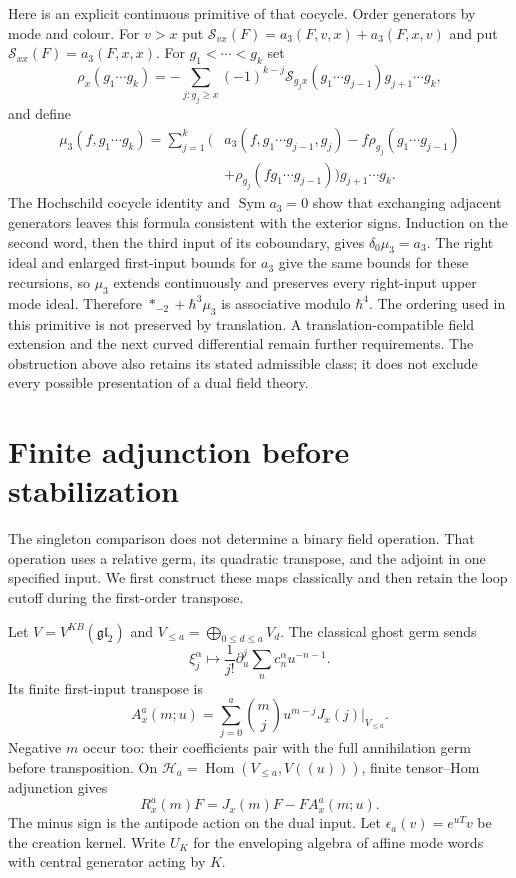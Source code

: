 Here is an explicit continuous primitive of that cocycle.  Order
generators by mode and colour.  For $v>x$ put
$\mathcal S_{vx}(F)=a_3(F,v,x)+a_3(F,x,v)$ and put
$\mathcal S_{xx}(F)=a_3(F,x,x)$.  For $g_1<\cdots<g_k$ set
\[
 \rho_x(g_1\cdots g_k)=
 -\sum_{j:g_j\geq x}(-1)^{k-j}
       \mathcal S_{g_jx}(g_1\cdots g_{j-1})g_{j+1}\cdots g_k,
\]
and define
\begin{equation}\label{cyquant:eq:cubic-primitive}
 \begin{aligned}
 \mu_3(f,g_1\cdots g_k)=\sum_{j=1}^k
 \bigl(&a_3(f,g_1\cdots g_{j-1},g_j)
       -f\rho_{g_j}(g_1\cdots g_{j-1})\\
       &+\rho_{g_j}(fg_1\cdots g_{j-1})\bigr)g_{j+1}\cdots g_k.
 \end{aligned}
\end{equation}
The Hochschild cocycle identity and $\operatorname{Sym}a_3=0$
show that exchanging adjacent generators leaves this formula
consistent with the exterior signs.  Induction on the second word,
then the third input of its coboundary, gives $\delta_0\mu_3=a_3$.
The right ideal and enlarged first-input bounds for $a_3$ give the
same bounds for these recursions, so $\mu_3$ extends continuously and
preserves every right-input upper mode ideal.  Therefore
$*_{-2}+\hbar^3\mu_3$ is associative modulo $\hbar^4$.
The ordering used in this primitive is not preserved by translation.
A translation-compatible field extension and the next curved
differential remain further requirements.  The obstruction above
also retains its stated admissible class; it does not exclude every
possible presentation of a dual field theory.

\section{Finite adjunction before stabilization}
\label{cyquant:sec:native-adjunction}

The singleton comparison does not determine a binary field operation.
That operation uses a relative germ, its quadratic transpose, and the
adjoint in one specified input.  We first construct these maps
classically and then retain the loop cutoff during the first-order
transpose.

Let $V=V^{KB}(\mathfrak{gl}_2)$ and
$V_{\leq a}=\bigoplus_{0\leq d\leq a}V_d$.
The classical ghost germ sends
\[
 \xi_j^\alpha\longmapsto\frac1{j!}\partial_u^j
                         \sum_nc_n^\alpha u^{-n-1}.
\]
Its finite first-input transpose is
\begin{equation}\label{cyquant:eq:native-inserted-action}
 A_x^a(m;u)=\sum_{j=0}^a\binom mj u^{m-j}J_x(j)|_{V_{\leq a}}.
\end{equation}
Negative $m$ occur too: their coefficients pair with the full
annihilation germ before transposition.  On
$\mathscr H_a=\operatorname{Hom}(V_{\leq a},V((u)))$, finite
tensor--Hom adjunction gives
\begin{equation}\label{cyquant:eq:native-hom-action}
 R_x^a(m)F=J_x(m)F-FA_x^a(m;u).
\end{equation}
The minus sign is the antipode action on the dual input.
Let $\epsilon_a(v)=e^{uT}v$ be the creation kernel.
Write $U_K$ for the enveloping algebra of affine mode words with
central generator acting by $K$.

